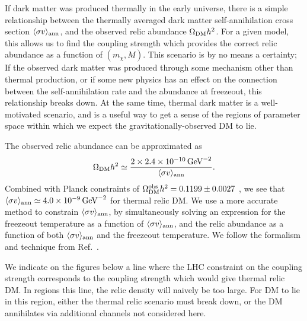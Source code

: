 If dark matter was produced thermally in the early universe, there is a simple relationship between the thermally averaged dark matter self-annihilation cross section $\langle\sigma v\rangle_{\rm ann}$, and the observed relic abundance $\Omega_{\rm DM}h^2$. For a given model, this allows us to find the coupling strength which provides the correct relic abundance as a function of $(m_\chi, M)$. 
%
This scenario is by no means a certainty; If the observed dark matter was produced through some mechanism other than thermal production, or if some new physics has an effect on the connection between the self-annihilation rate and the abundance at freezeout, this relationship breaks down. At the same time, thermal dark matter is a well-motivated scenario, and is a useful way to get a sense of the regions of parameter space within which we expect the gravitationally-observed DM to lie. 

The observed relic abundance can be approximated as
%
\begin{equation}
\Omega_{\rm DM}h^2\simeq \frac{2\times2.4\times 10^{-10}\,{\rm GeV}^{-2}}{\langle\sigma v\rangle_{\rm ann}}.
\label{simplerelic}
\end{equation}
%
Combined with Planck constraints of $\Omega_{\rm DM}^{\rm obs}h^2=0.1199\pm0.0027$ \cite{Ade:2013zuv}, we see that $\langle\sigma v\rangle_{\rm ann}\simeq 4.0\times 10^{-9}\,{\rm GeV}^{-2}$ for thermal relic DM. 
%
We use a more accurate method to constrain $\langle\sigma v\rangle_{\rm ann}$, by simultaneously solving an expression for the freezeout temperature as a function of $\langle\sigma v\rangle_{\rm ann}$, and the relic abundance as a function of both $\langle\sigma v\rangle_{\rm ann}$ and the freezeout temperature. We follow the formalism and technique from Ref.~\cite{Busoni:2014gta}.

We indicate on the figures below a line where the LHC constraint on the coupling strength corresponds to the coupling strength which would give thermal relic DM. In regions  this line, the relic density will naively be too large. For DM to lie in this region, either the thermal relic scenario must break down, or the DM annihilates via additional channels not considered here.
